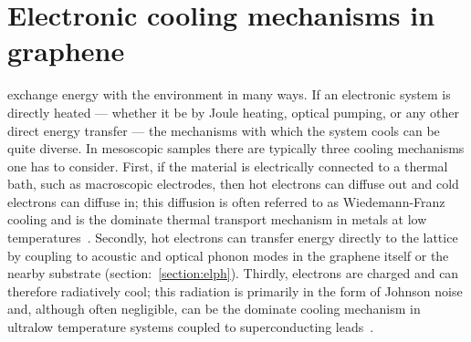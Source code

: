 
\chapter{Electronic cooling mechanisms in graphene}
\label{ch:electronic_cooling}
 exchange energy with the environment in many ways. If an electronic system is directly heated --- whether it be by Joule heating, optical pumping, or any other direct energy transfer --- the mechanisms with which the system cools can be quite diverse. In mesoscopic samples there are typically three cooling mechanisms one has to consider. First, if the material is electrically connected to a thermal bath, such as macroscopic electrodes, then hot electrons can diffuse out and cold electrons can diffuse in; this diffusion is often referred to as Wiedemann-Franz cooling and is the dominate thermal transport mechanism in metals at low temperatures~\cite{ashcroft_solid_1976}. Secondly, hot electrons can transfer energy directly to the lattice by coupling to acoustic and optical phonon modes in the graphene itself or the nearby substrate (section:~\ref{section:elph}). Thirdly, electrons are charged and can therefore radiatively cool; this radiation is primarily in the form of Johnson noise and, although often negligible, can be the dominate cooling mechanism in ultralow temperature systems coupled to superconducting leads~\cite{mckitterick_performance_2013, mckitterick_electron-phonon_2016}.

